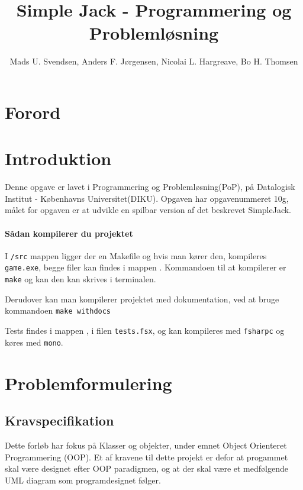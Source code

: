 \documentclass[a4paper]{article}
\title{Simple Jack - Programmering og Problemløsning}
\author{Mads U. Svendsen, Anders F. Jørgensen, Nicolai L. Hargreave, Bo H. Thomsen}
\begin{document}
	\maketitle %
        
  \tableofcontents

  \newpage

\section{Forord}
    
\section{Introduktion}
    Denne opgave er lavet i Programmering og Problemløsning(PoP),
    på Datalogisk Institut - Københavns Universitet(DIKU).
    Opgaven har opgavenummeret 10g,
    målet for opgaven er at udvikle en spilbar version af det beskrevet SimpleJack.

    \paragraph*{Sådan kompilerer du projektet\\}
    I \lstinline$/src$ mappen ligger der en Makefile og hvis man kører den, 
    kompileres \lstinline$game.exe$,
    begge filer kan findes i mappen .
    Kommandoen til at kompilerer er  \lstinline$make$ og kan den kan skrives i terminalen.

    Derudover kan man kompilerer projektet med dokumentation, ved at bruge kommandoen \lstinline$make withdocs$

    Tests findes i  mappen , i filen \lstinline$tests.fsx$,
    og kan kompileres med \lstinline$fsharpc$ og køres med \lstinline$mono$.

\newpage

\section{Problemformulering}

    \subsection{Kravspecifikation}
      Dette forløb har fokus på Klasser og objekter,
      under emnet Object Orienteret Programmering (OOP).
      Et af kravene til dette projekt er defor at progammet skal være designet efter OOP paradigmen,
      og at der skal være et medfølgende UML diagram som programdesignet følger.
\end{document}
